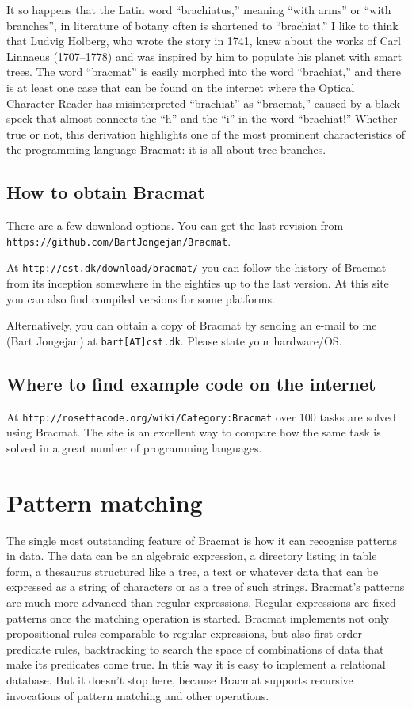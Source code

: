 \documentclass[12pt]{article}
\begin{document}
It so happens that the Latin word ``brachiatus,'' meaning ``with
arms'' or ``with branches'', in literature of botany often is
shortened to ``brachiat.'' I like to think that Ludvig Holberg, who
wrote the story in 1741, knew about the works of Carl Linnaeus
(1707--1778) and was inspired by him to populate his planet with smart
trees. The word ``bracmat'' is easily morphed into the word
``brachiat,'' and there is at least one case that can be found on the
internet where the Optical Character Reader has misinterpreted
``brachiat'' as ``bracmat,'' caused by a black speck that almost connects
the ``h'' and the ``i'' in the word ``brachiat!'' Whether true or not, this
derivation highlights one of the most prominent characteristics of the
programming language Bracmat: it is all about tree branches.

\subsection{How to obtain Bracmat}

There are a few download options. You can get the last revision from
\texttt{https://github.com/\allowbreak{}BartJongejan/\allowbreak{}Bracmat}.

At \texttt{http://cst.dk/download/bracmat/} you can follow the history
of Bracmat from its inception somewhere in the eighties up to the last
version. At this site you can also find compiled versions for some
platforms.

Alternatively, you can obtain a copy of Bracmat by sending an e-mail
to me (Bart Jongejan) at \texttt{bart[AT]cst.dk}. Please state your
hardware/OS.

\subsection{Where to find example code on the internet}

At \texttt{http://rosettacode.org/wiki/Category:Bracmat} over 100
tasks are solved using Bracmat. The site is an excellent way to
compare how the same task is solved in a great number of programming
languages.

\section{Pattern matching}

The single most outstanding feature of Bracmat is how it can recognise
patterns in data. The data can be an algebraic expression, a directory
listing in table form, a thesaurus structured like a tree, a text or
whatever data that can be expressed as a string of characters or as a
tree of such strings. Bracmat's patterns are much more advanced than
regular expressions. Regular expressions are fixed patterns once the
matching operation is started. Bracmat implements not only
propositional rules comparable to regular expressions, but also first
order predicate rules, backtracking to search the space of
combinations of data that make its predicates come true. In this way
it is easy to implement a relational database. But it doesn't
stop here, because Bracmat supports recursive invocations of pattern
matching and other operations.
\end{document}
